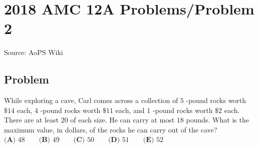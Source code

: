 \documentclass[12pt]{article}
\begin{document}
\section*{{2018 AMC 12A Problems/Problem 2}}
Source: AoPS Wiki

\subsection*{Problem}
While exploring a cave, Carl comes across a collection of $5$ -pound rocks worth $\$14$ each, $4$ -pound rocks worth $\$11$ each, and $1$ -pound rocks worth $\$2$ each. There are at least $20$ of each size. He can carry at most $18$ pounds. What is the maximum value, in dollars, of the rocks he can carry out of the cave? $\textbf{(A) } 48 \qquad \textbf{(B) } 49 \qquad \textbf{(C) } 50 \qquad \textbf{(D) } 51 \qquad \textbf{(E) } 52$
\end{document}
